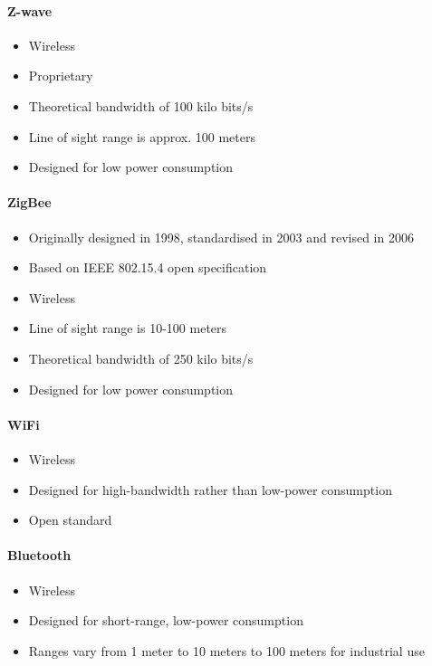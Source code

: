 \paragraph{Z-wave} \cite{zwave}

\begin{itemize}
\item Wireless
\item Proprietary
\item Theoretical bandwidth of 100 kilo bits/s
\item Line of sight range is approx. 100 meters
\item Designed for low power consumption
\end{itemize}


\paragraph{ZigBee} \cite{zigbee}

\begin{itemize}
\item Originally designed in 1998, standardised in 2003 and revised in 2006
\item Based on IEEE 802.15.4 open specification
\item Wireless
\item Line of sight range is 10-100 meters
\item Theoretical bandwidth of 250 kilo bits/s
\item Designed for low power consumption
\end{itemize}

\paragraph{WiFi} \cite{wifi}

\begin{itemize}
\item Wireless
\item Designed for high-bandwidth rather than low-power consumption
\item Open standard
\end{itemize}


\paragraph{Bluetooth} \cite{bluetooth}

\begin{itemize}
\item Wireless
\item Designed for short-range, low-power consumption
\item Ranges vary from 1 meter to 10 meters to 100 meters for industrial use
\end{itemize}




